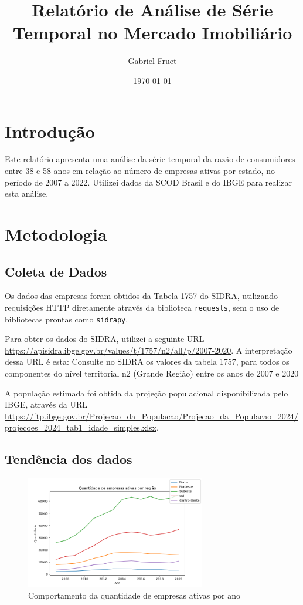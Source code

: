 \documentclass[12pt]{article}
\title{Relatório de Análise de Série Temporal no Mercado Imobiliário}
\author{Gabriel Fruet} \date{\today}
\begin{document}
\maketitle

\section{Introdução} Este relatório apresenta uma análise da série temporal da
razão de consumidores entre 38 e 58 anos em relação ao número de empresas
ativas por estado, no período de 2007 a 2022. Utilizei dados da SCOD Brasil e
do IBGE para realizar esta análise.

\section{Metodologia} 

\subsection{Coleta de Dados} Os dados das empresas foram
obtidos da Tabela 1757 do SIDRA, utilizando requisições HTTP diretamente
através da biblioteca \texttt{requests}, sem o uso de bibliotecas prontas como
\texttt{sidrapy}. 

Para obter os dados do SIDRA, utilizei a seguinte URL 
\url{https://apisidra.ibge.gov.br/values/t/1757/n2/all/p/2007-2020}.
A interpretação dessa URL é esta: Consulte no SIDRA os valores da tabela 1757,
para todos os componentes do  nível territorial n2 (Grande Região) entre os 
anos de 2007 e 2020

A população estimada foi obtida da projeção populacional
disponibilizada pelo IBGE, através da URL \url{https://ftp.ibge.gov.br/Projecao_da_Populacao/Projecao_da_Populacao_2024/projecoes_2024_tab1_idade_simples.xlsx}.

\subsection{Tendência dos dados}

\begin{figure}[!htbp]
    \begin{center}
    \includegraphics[width=0.7\textwidth]{../figures/time_series_business.png}
    \caption{\label{fig:trend_bus} Comportamento da quantidade de empresas ativas por ano}
    \end{center}
\end{figure}
\end{document}
